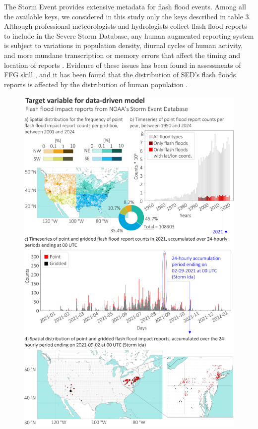 The Storm Event provides extensive metadata for flash flood events. Among all the available keys, we considered in this study only the keys described in table 3. Although professional meteorologists and hydrologists collect flash flood reports to include in the Severe Storm Database, any human augmented reporting system is subject to variations in population density, diurnal cycles of human activity, and more mundane transcription or memory errors that affect the timing and location of reports \citep{Barthold_2015}. Evidence of these issues has been found in assessments of FFG skill \citep{Clark_2014}, and it has been found that the distribution of SED's flash floods reports is affected by the distribution of human population \cite{Marjerison_2016}. 

\begin{figure}[htbp]
\centering
\includegraphics[width=\textwidth]{sed_ff_reports.png}

\end{figure}
